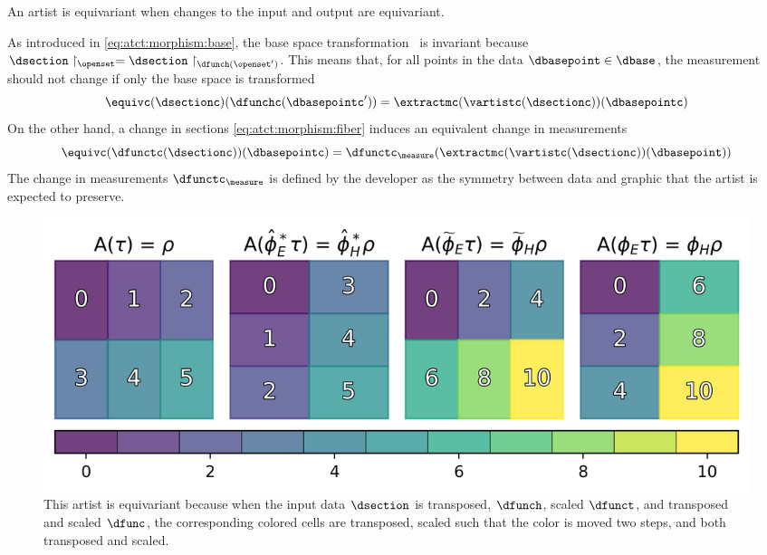 \documentclass[10pt,journal,compsoc]{IEEEtran}
\theoremstyle{definition}
\theoremstyle{remark}
\begin{document}
An artist is equivariant when changes to the input and output are equivariant.

As introduced in \autoref{eq:atct:morphism:base}, the base space transformation \dfunch\ is invariant because $\dsection\restriction_{\openset} = \dsection\restriction_{\dfunch(\openset^{\prime})}$. This means that, for all points in the data $\dbasepoint \in \dbase$, the measurement should not change if only the base space is transformed 
\begin{equation}
  \label{eq:atct:equivarance:verify:base}
  \equivc(\dsectionc)(\dfunchc(\dbasepointc^{\prime})) = \extractmc(\vartistc(\dsectionc))(\dbasepointc)
\end{equation}
On the other hand, a change in sections \autoref{eq:atct:morphism:fiber} induces an equivalent change in measurements
\begin{equation}
  \label{eq:atct:equivarance:verify:fiber}
  \equivc(\dfunctc(\dsectionc))(\dbasepointc) = \dfunctc_{\measure}(\extractmc(\vartistc(\dsectionc))(\dbasepoint))
\end{equation}
The change in measurements $\dfunctc_{\measure}$ is defined by the developer as the symmetry between data and graphic that the artist is expected to preserve. 

\begin{figure}[h!]
  \includegraphics[width=1\columnwidth]{equivariance.png}
  \caption{This artist is equivariant because when the input data $\dsection$ is transposed, $\dfunch$, scaled $\dfunct$, and transposed and scaled $\dfunc$, the corresponding colored cells are transposed, scaled such that the color is moved two steps, and both transposed and scaled. 
  \label{fig:artist:equivariance}}
\end{figure}
\end{document}
